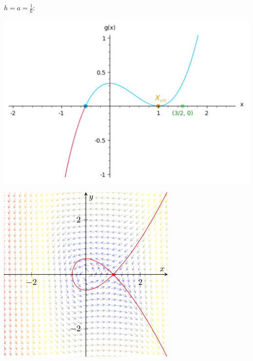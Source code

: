 \documentclass[10pt,a4paper]{article}
\begin{document}
\underline{$h=a=\frac{1}{6}$}:
\begin{center}
  \begin{minipage}[c]{0.57\textwidth}\hspace{3mm}
    \includegraphics[scale=0.38]{Images/gh=a}
    \label{gh=a}
  \end{minipage}\hfill
  \begin{minipage}[h]{0.43\textwidth}
    \includegraphics[scale=1.1]{Images/retrat2h1i6}
    \label{retrat1i6}
  \end{minipage}
\end{center}
\end{document}
